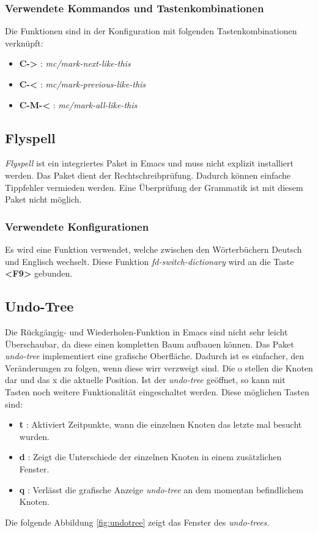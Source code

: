 \subsubsection{Verwendete Kommandos und Tastenkombinationen}
Die Funktionen sind in der Konfiguration mit folgenden
Tastenkombinationen verknüpft:
\begin{itemize}
\item \textbf{C->} : \textit{mc/mark-next-like-this}
\item \textbf{C-<} : \textit{mc/mark-previous-like-this}
\item \textbf{C-M-<} : \textit{mc/mark-all-like-this}
\end{itemize}

\subsection{Flyspell}
\label{subsec:flyspell}
\textit{Flyspell} ist ein integriertes Paket in Emacs und muss nicht
explizit installiert werden. Das Paket dient der Rechtschreibprüfung.
Dadurch können einfache Tippfehler vermieden werden. Eine Überprüfung
der Grammatik ist mit diesem Paket nicht möglich. \cite{Flyspell}\\

\subsubsection{Verwendete Konfigurationen}
Es wird eine Funktion verwendet, welche zwischen den Wörterbüchern
Deutsch und Englisch wechselt. Diese Funktion
\textit{fd-switch-dictionary} wird an die Taste \textbf{<F9>}
gebunden.\\

\subsection{Undo-Tree}
\label{subsec:undotree}
Die Rückgängig- und Wiederholen-Funktion in Emacs sind nicht sehr
leicht Überschaubar, da diese einen kompletten Baum aufbauen
können. Das Paket \textit{undo-tree} implementiert eine grafische
Oberfläche. Dadurch ist es einfacher, den Veränderungen zu folgen,
wenn diese wirr verzweigt sind. Die {\glqq}o{\grqq} stellen die Knoten
dar und das {\glqq}x{\grqq} die aktuelle Position. Ist der
\textit{undo-tree} geöffnet, so kann mit Tasten noch weitere
Funktionalität eingeschaltet werden. Diese möglichen Tasten sind:
\begin{itemize}
\item \textbf{t} : Aktiviert Zeitpunkte, wann die einzelnen Knoten das
  letzte mal besucht wurden.
\item \textbf{d} : Zeigt die Unterschiede der einzelnen Knoten in
  einem zusätzlichen Fenster.
\item \textbf{q} : Verlässt die grafische Anzeige \textit{undo-tree}
  an dem momentan befindlichem Knoten.
\end{itemize}
Die folgende Abbildung \ref{fig:undotree} zeigt das Fenster des
\textit{undo-trees}. \cite{UndoTree}

